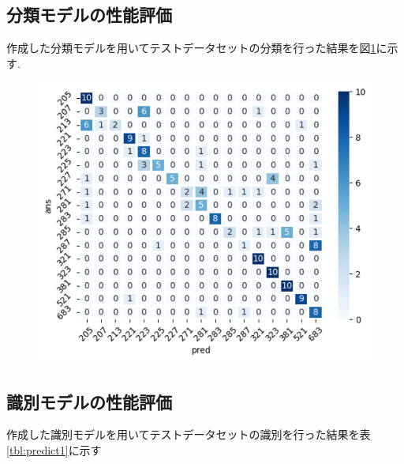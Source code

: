 \begin{multicols*}{2}
\subsection{分類モデルの性能評価}
作成した分類モデルを用いてテストデータセットの分類を行った結果を図\ref{fig:classifyresults}に示す.
\begin{figure}
	\centering
	\includegraphics[width=\linewidth]{obj/classify_results.pdf}
	\label{fig:classifyresults}
\end{figure}

\subsection{識別モデルの性能評価}
作成した識別モデルを用いてテストデータセットの識別を行った結果を表\ref{tbl:predict1}に示す



\end{multicols*}
